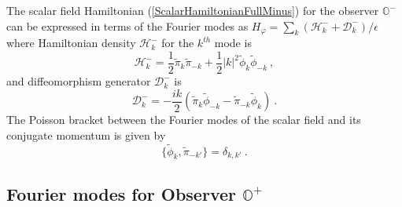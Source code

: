 \documentclass[aps,twocolumn,showpacs]{revtex4}
\def\observerminus{\mathbb{O}^{-}}
\def\observerplus{\mathbb{O}^{+}}
\begin{document}
The scalar field Hamiltonian (\ref{ScalarHamiltonianFullMinus}) for the observer
$\observerminus$ can be expressed in terms of the Fourier modes as 
$H_{\varphi} = \sum_k (\mathcal{H}_k^{-} + \mathcal{D}_k^{-})/\epsilon$ where
Hamiltonian density $\mathcal{H}_k^{-}$ for the $k^{th}$ mode is
%
\begin{equation}\label{FourierHamiltonianMinus}
\mathcal{H}_k^{-} = \frac{1}{2} \tilde{\pi}_{k}  \tilde{\pi}_{-k}
+ \frac{1}{2} |k|^2 \tilde{\phi}_{k}  \tilde{\phi}_{-k} ~,
\end{equation}
%
and diffeomorphism generator $\mathcal{D}_k^{-}$ is
\begin{equation}\label{FourierDiffeomorphismMinus}
\mathcal{D}_k^{-} = - \frac{i k}{2} \left( 
\tilde{\pi}_{k} \tilde{\phi}_{-k} - 
\tilde{\pi}_{-k} \tilde{\phi}_{k} \right) ~.
\end{equation}
%
The Poisson bracket between the Fourier modes of the scalar field and its 
conjugate momentum is given by
%
\begin{equation}\label{FourierPoissonBracketMinus}
\{\tilde{\phi}_{k}, \tilde{\pi}_{-k'}\} = \delta_{k,k'} ~.
\end{equation}
%




\subsection{Fourier modes for Observer $\observerplus$ }
\end{document}
